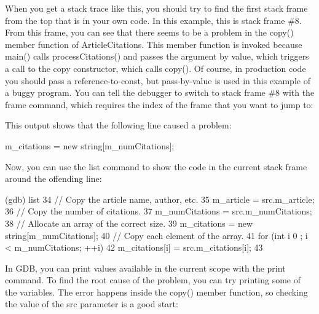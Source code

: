 When you get a stack trace like this, you should try to find the first stack frame from the top that is in your own code. In this example, this is stack frame \#8. From this frame, you can see that there seems to be a problem in the copy() member function of ArticleCitations. This member function is invoked because main() calls processCitations() and passes the argument by value, which triggers a call to the copy constructor, which calls copy(). Of course, in production code you should pass a reference-to-const, but pass-by-value is used in this example of a buggy program. You can tell the debugger to switch to stack frame \#8 with the frame command, which requires the index of the frame that you want to jump to:


This output shows that the following line caused a problem:

\begin{cpp}
m_citations = new string[m_numCitations];
\end{cpp}

Now, you can use the list command to show the code in the current stack frame around the offending line:

\begin{shell}
(gdb) list
34      // Copy the article name, author, etc.
35      m_article = src.m_article;
36      // Copy the number of citations.
37      m_numCitations = src.m_numCitations;
38      // Allocate an array of the correct size.
39      m_citations = new string[m_numCitations];
40      // Copy each element of the array.
41      for (int i { 0 }; i < m_numCitations; ++i) {
42          m_citations[i] = src.m_citations[i];
43      }
\end{shell}

In GDB, you can print values available in the current scope with the print command. To find the root cause of the problem, you can try printing some of the variables. The error happens inside the copy() member function, so checking the value of the src parameter is a good start:


